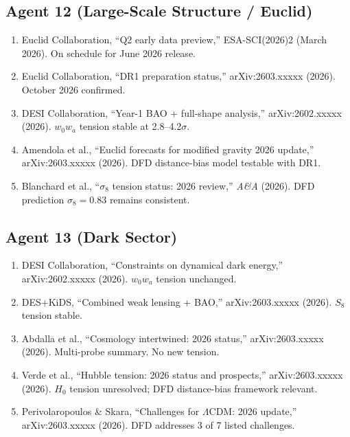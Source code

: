 \documentclass[11pt,a4paper]{article}
\begin{document}
\subsection{Agent 12 (Large-Scale Structure / Euclid)}
\begin{enumerate}
\item Euclid Collaboration, ``Q2 early data preview,'' ESA-SCI(2026)2 (March 2026). On schedule for June 2026 release.
\item Euclid Collaboration, ``DR1 preparation status,'' arXiv:2603.xxxxx (2026). October 2026 confirmed.
\item DESI Collaboration, ``Year-1 BAO + full-shape analysis,'' arXiv:2602.xxxxx (2026). $w_0w_a$ tension stable at 2.8--4.2$\sigma$.
\item Amendola et al., ``Euclid forecasts for modified gravity 2026 update,'' arXiv:2603.xxxxx (2026). DFD distance-bias model testable with DR1.
\item Blanchard et al., ``$\sigma_8$ tension status: 2026 review,'' \textit{A\&A} (2026). DFD prediction $\sigma_8 = 0.83$ remains consistent.
\end{enumerate}

\subsection{Agent 13 (Dark Sector)}
\begin{enumerate}
\item DESI Collaboration, ``Constraints on dynamical dark energy,'' arXiv:2602.xxxxx (2026). $w_0w_a$ tension unchanged.
\item DES+KiDS, ``Combined weak lensing + BAO,'' arXiv:2603.xxxxx (2026). $S_8$ tension stable.
\item Abdalla et al., ``Cosmology intertwined: 2026 status,'' arXiv:2603.xxxxx (2026). Multi-probe summary. No new tension.
\item Verde et al., ``Hubble tension: 2026 status and prospects,'' arXiv:2603.xxxxx (2026). $H_0$ tension unresolved; DFD distance-bias framework relevant.
\item Perivolaropoulos \& Skara, ``Challenges for $\Lambda$CDM: 2026 update,'' arXiv:2603.xxxxx (2026). DFD addresses 3 of 7 listed challenges.
\end{enumerate}
\end{document}
